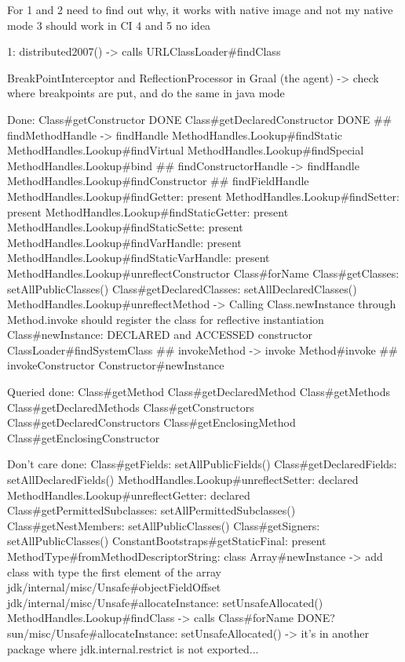 For 1 and 2 need to find out why, it works with native image and not my native mode
3 should work in CI
4 and 5 no idea

1: distributed2007() -> calls URLClassLoader#findClass

BreakPointInterceptor and ReflectionProcessor in Graal (the agent) -> check where breakpoints are put, and do the same in java mode

Done:
Class\#getConstructor DONE
Class\#getDeclaredConstructor DONE
## findMethodHandle -> findHandle
MethodHandles.Lookup\#findStatic
MethodHandles.Lookup\#findVirtual
MethodHandles.Lookup\#findSpecial
MethodHandles.Lookup\#bind
## findConstructorHandle -> findHandle
MethodHandles.Lookup\#findConstructor
## findFieldHandle
MethodHandles.Lookup\#findGetter: present
MethodHandles.Lookup\#findSetter: present
MethodHandles.Lookup\#findStaticGetter: present
MethodHandles.Lookup\#findStaticSette: present
MethodHandles.Lookup\#findVarHandle: present
MethodHandles.Lookup\#findStaticVarHandle: present
MethodHandles.Lookup\#unreflectConstructor
Class\#forName
Class\#getClasses: setAllPublicClasses()
Class\#getDeclaredClasses: setAllDeclaredClasses() 
MethodHandles.Lookup\#unreflectMethod -> Calling Class.newInstance through Method.invoke should register the class for reflective instantiation
Class\#newInstance: DECLARED and ACCESSED constructor
ClassLoader\#findSystemClass
## invokeMethod -> invoke
Method\#invoke
## invokeConstructor 
Constructor\#newInstance

Queried done:
Class\#getMethod
Class\#getDeclaredMethod
Class\#getMethods
Class\#getDeclaredMethods
Class\#getConstructors
Class\#getDeclaredConstructors
Class\#getEnclosingMethod
Class\#getEnclosingConstructor

Don't care done:
Class\#getFields: setAllPublicFields()
Class\#getDeclaredFields: setAllDeclaredFields()
MethodHandles.Lookup\#unreflectSetter: declared
MethodHandles.Lookup\#unreflectGetter: declared 
Class\#getPermittedSubclasses: setAllPermittedSubclasses()
Class\#getNestMembers: setAllPublicClasses()
Class\#getSigners: setAllPublicClasses()
ConstantBootstraps\#getStaticFinal: present
MethodType\#fromMethodDescriptorString: class
Array\#newInstance -> add class with type the first element of the array
jdk/internal/misc/Unsafe\#objectFieldOffset 
jdk/internal/misc/Unsafe\#allocateInstance: setUnsafeAllocated() 
MethodHandles.Lookup\#findClass -> calls Class\#forName DONE?
sun/misc/Unsafe\#allocateInstance: setUnsafeAllocated() -> it's in another package where jdk.internal.restrict is not exported...

